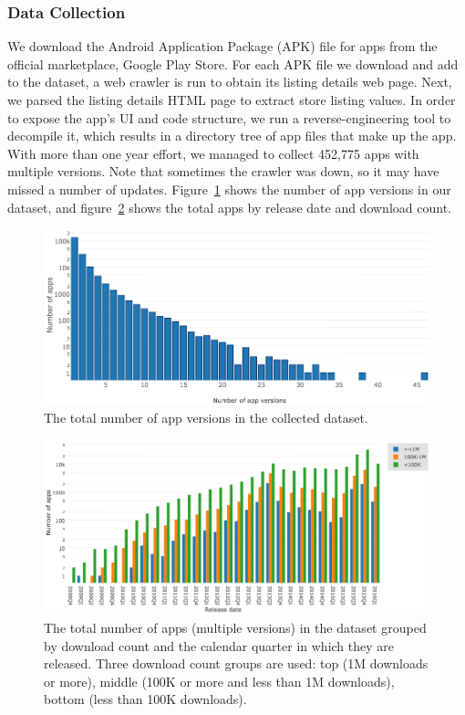 \subsubsection{Data Collection}
We download the Android Application Package (APK) file for apps from the official marketplace, Google Play Store.
For each APK file we download and add to the dataset, a web crawler is run to obtain its listing details web page.
Next, we parsed the listing details HTML page to extract store listing values.
In order to expose the app's UI and code structure, we run a reverse-engineering tool to decompile it, which results in a directory tree of app files that make up the app. 
With more than one year effort, we managed to collect 452,775 apps with multiple versions. Note that sometimes the crawler was down, so it may have missed a number of updates.
Figure~\ref{fig:fig_dataset_app_versions} shows the number of app versions in our dataset, and figure~\ref{fig:fig_dataset_app_release_downloads} shows the total apps by release date and download count.
\begin{figure}
	\centering
	\includegraphics[scale=0.5]{figures/sieveable-deep-search/dataset_app_versions.png}
	\caption{The total number of app versions in the collected dataset.}
	\label{fig:fig_dataset_app_versions}
\end{figure}
\begin{figure}
	\centering
	\includegraphics[scale=0.5]{figures/sieveable-deep-search/dataset_app_release_downloads.png}
	\caption{The total number of apps (multiple versions) in the dataset grouped by download count and the calendar quarter in which they are released. Three download count groups are used: top (1M downloads or more), middle (100K or more and less than 1M downloads), bottom (less than 100K downloads).}
	\label{fig:fig_dataset_app_release_downloads}
\end{figure}
